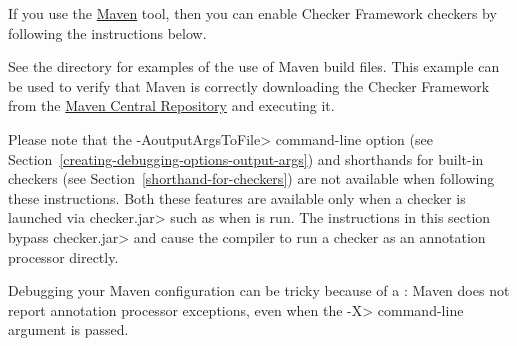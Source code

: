 
If you use the \href{https://maven.apache.org/}{Maven} tool,
then you can enable Checker Framework checkers by following the
instructions below.

See the directory  for examples of the use of
Maven build files.
This example can be used to verify that
Maven is correctly downloading the Checker Framework from the
\href{https://search.maven.org/search?q=org.checkerframework}{Maven
  Central Repository} and executing it.

Please note that the \<-AoutputArgsToFile> command-line option
(see Section~\ref{creating-debugging-options-output-args}) and shorthands for built-in checkers
(see Section~\ref{shorthand-for-checkers}) are not available when
following these instructions.  Both these features are available only when a checker is
launched via \<checker.jar> such as when 
is run.  The instructions in this section
bypass \<checker.jar> and cause the compiler to run a
checker as an annotation processor directly.

Debugging your Maven configuration can be tricky because of a
: Maven does not report
annotation processor exceptions, even when
the \<-X> command-line argument is passed.


